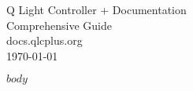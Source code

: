 \documentclass{article}
\begin{document}
\begin{titlepage}
    \pagestyle{empty}
    \protect\thispagestyle{empty}

    \begin{center}
        \vfill
        {\Huge Q Light Controller + Documentation} \\
        {\LARGE Comprehensive Guide} \\
        \vfill
        {\Large docs.qlcplus.org} \\
        \vfill
        {\Large \today}  %
    \end{center}
\end{titlepage}

$body$
\end{document}
